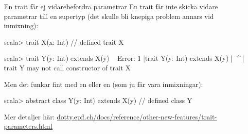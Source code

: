 \begin{Slide}{En trait får ej vidarebefordra parametrar}\SlideFontSmall
En trait får inte skicka vidare parametrar till en supertyp (det skulle bli knepiga problem annars vid inmixning):
\begin{REPLnonum}
scala> trait X(x: Int)
// defined trait X

scala> trait Y(y: Int) extends X(y)
-- Error:
1 |trait Y(y: Int) extends X(y)
  |                        ^^^^
  |  trait Y may not call constructor of trait X
\end{REPLnonum}
Men det funkar fint med en  eller en  (som ju  får vara inmixningar):
\begin{REPLnonum}
scala> abstract class Y(y: Int) extends X(y)                                                           
// defined class Y
\end{REPLnonum}
{ \SlideFontTiny Mer detaljer här: \href{https://dotty.epfl.ch/docs/reference/other-new-features/trait-parameters.html}{dotty.epfl.ch/docs/reference/other-new-features/trait-parameters.html}}
\end{Slide}



